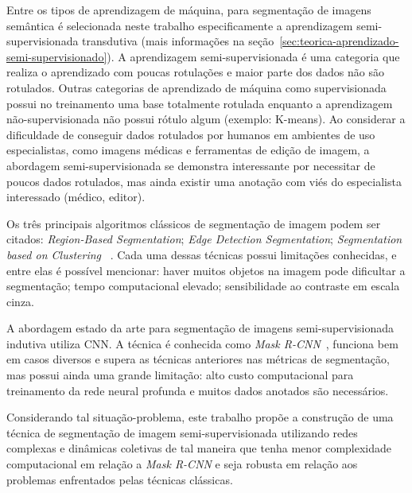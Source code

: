 Entre os tipos de aprendizagem de máquina, para segmentação de imagens
semântica é selecionada neste trabalho especificamente a aprendizagem
semi-supervisionada transdutiva (mais informações na seção~\ref{sec:teorica-aprendizado-semi-supervisionado}). A
aprendizagem semi-supervisionada é uma categoria que realiza o
aprendizado com poucas rotulações e maior parte dos dados não são
rotulados. Outras categorias de aprendizado de máquina como
supervisionada possui no treinamento uma base totalmente rotulada
enquanto a aprendizagem não-supervisionada não possui rótulo algum
(exemplo: K-means). Ao considerar a dificuldade de conseguir dados
rotulados por humanos em ambientes de uso especialistas, como imagens
médicas e ferramentas de edição de imagem, a abordagem
semi-supervisionada se demonstra interessante por necessitar de poucos
dados rotulados, mas ainda existir uma anotação com viés do
especialista interessado (médico, editor).


Os três principais algoritmos clássicos de segmentação de imagem podem
ser citados: \textit{Region-Based Segmentation}; \textit{Edge Detection
  Segmentation}; \textit{Segmentation based on Clustering}
~\cite{ImageSegmentationTechniques1985}. Cada uma dessas técnicas
possui limitações conhecidas, e entre elas é possível mencionar: haver
muitos objetos na imagem pode dificultar a segmentação; tempo
computacional elevado; sensibilidade ao contraste em escala cinza.

A abordagem estado da arte para segmentação de imagens
semi-supervisionada indutiva utiliza \gls{CNN}. A técnica é conhecida
como \textit{Mask R-CNN}~\cite{he2018mask}, funciona bem em casos
diversos e supera as técnicas anteriores nas métricas de segmentação,
mas possui ainda uma grande limitação: alto custo computacional para
treinamento da rede neural profunda e muitos dados anotados são
necessários.

Considerando tal situação-problema, este trabalho propõe a construção
de uma técnica de segmentação de imagem semi-supervisionada utilizando
redes complexas e dinâmicas coletivas de tal maneira que tenha menor
complexidade computacional em relação a \textit{Mask R-CNN} e seja
robusta em relação aos problemas enfrentados pelas técnicas clássicas.

